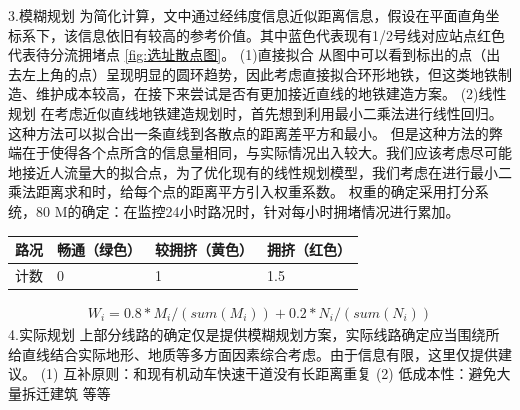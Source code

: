 \documentclass[12pt,a4paper]{mcmthesis}
\begin{document}
3.模糊规划
为简化计算，文中通过经纬度信息近似距离信息，假设在平面直角坐标系下，该信息依旧有较高的参考价值。其中蓝色代表现有1/2号线对应站点红色代表待分流拥堵点 \ref{fig:选址散点图}。
(1)直接拟合
从图中可以看到标出的点（出去左上角的点）呈现明显的圆环趋势，因此考虑直接拟合环形地铁，但这类地铁制造、维护成本较高，在接下来尝试是否有更加接近直线的地铁建造方案。
(2)线性规划
在考虑近似直线地铁建造规划时，首先想到利用最小二乘法进行线性回归。这种方法可以拟合出一条直线到各散点的距离差平方和最小。
但是这种方法的弊端在于使得各个点所含的信息量相同，与实际情况出入较大。我们应该考虑尽可能地接近人流量大的拟合点，为了优化现有的线性规划模型，我们考虑在进行最小二乘法距离求和时，给每个点的距离平方引入权重系数。
权重的确定采用打分系统，80%
M的确定：在监控24小时路况时，针对每小时拥堵情况进行累加。
\begin{table}
	\centering
	\begin{tabular}{|l|l|l|l|}
		\hline
		路况 & 畅通（绿色） & 较拥挤（黄色） & 拥挤（红色） \\ \hline
		计数 & 0 & 1 & 1.5 \\ \hline
	\end{tabular}
\end{table}
\begin{equation}
	\begin{aligned}
		W_i=0.8*M_i/(sum(M_i))+0.2*N_i/(sum(N_i))
	\end{aligned}
\end{equation}
4.实际规划
上部分线路的确定仅是提供模糊规划方案，实际线路确定应当围绕所给直线结合实际地形、地质等多方面因素综合考虑。由于信息有限，这里仅提供建议。
(1)	互补原则：和现有机动车快速干道没有长距离重复
(2)	低成本性：避免大量拆迁建筑
等等
\end{document}
